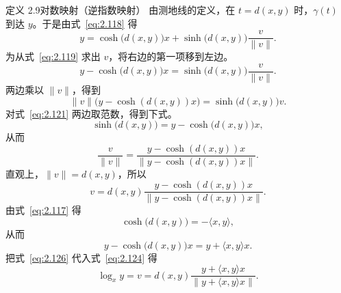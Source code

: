 \begin{statement}{定义 2.9}{对数映射（逆指数映射）}
由测地线的定义，在 $t=d(x,y)$ 时，$\gamma(t)$ 到达 $y$。于是由式~\eqref{eq:2.118} 得
\begin{equation*}
  y=\cosh\bigl(d(x,y)\bigr)x+\sinh\bigl(d(x,y)\bigr)\frac{v}{\lVert v\rVert}.
  \tag{2.119}\label{eq:2.119}
\end{equation*}
为从式~\eqref{eq:2.119} 求出 $v$，将右边的第一项移到左边。
\begin{equation*}
  y-\cosh\bigl(d(x,y)\bigr)x=\sinh\bigl(d(x,y)\bigr)\frac{v}{\lVert v\rVert}.
  \tag{2.120}\label{eq:2.120}
\end{equation*}
两边乘以 $\lVert v\rVert$，得到
\begin{equation*}
  \lVert v\rVert\bigl(y-\cosh(d(x,y))x\bigr)=\sinh\bigl(d(x,y)\bigr)v.
  \tag{2.121}\label{eq:2.121}
\end{equation*}
对式~\eqref{eq:2.121} 两边取范数，得到下式。
\begin{equation*}
  \sinh\bigl(d(x,y)\bigr)=y-\cosh\bigl(d(x,y)\bigr)x,
  \tag{2.122}\label{eq:2.122}
\end{equation*}
从而
\begin{equation*}
  \frac{v}{\lVert v\rVert}
    =\frac{y-\cosh(d(x,y))x}{\lVert y-\cosh(d(x,y))x\rVert}.
  \tag{2.123}\label{eq:2.123}
\end{equation*}
直观上，$\lVert v\rVert=d(x,y)$，所以
\begin{equation*}
  v=d(x,y)\frac{y-\cosh(d(x,y))x}{\lVert y-\cosh(d(x,y))x\rVert}.
  \tag{2.124}\label{eq:2.124}
\end{equation*}
由式~\eqref{eq:2.117} 得
\begin{equation*}
  \cosh\bigl(d(x,y)\bigr)=-\langle x,y\rangle,
  \tag{2.125}\label{eq:2.125}
\end{equation*}
从而
\begin{equation*}
  y-\cosh\bigl(d(x,y)\bigr)x=y+\langle x,y\rangle x.
  \tag{2.126}\label{eq:2.126}
\end{equation*}
把式~\eqref{eq:2.126} 代入式~\eqref{eq:2.124} 得
\begin{equation*}
  \log_x y=v=d(x,y)\frac{y+\langle x,y\rangle x}
                        {\lVert y+\langle x,y\rangle x\rVert}.
  \tag{2.127}\label{eq:2.127}
\end{equation*}
\end{statement}

